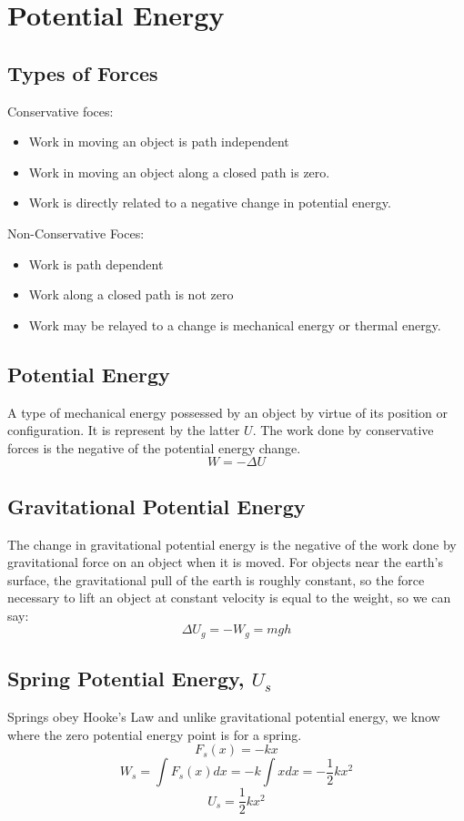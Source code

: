 \section{Potential Energy}

\subsection{Types of Forces}
\noindent Conservative foces:
\begin{itemize}
	\item Work in moving an object is path independent
	\item Work in moving an object along a closed path is zero.
	\item Work is directly related to a negative change in potential energy.
\end{itemize}

\noindent Non-Conservative Foces:
\begin{itemize}
	\item Work is path dependent
	\item Work along a closed path is not zero
	\item Work may be relayed to a change is mechanical energy or thermal energy.
\end{itemize}

\subsection{Potential Energy}
A type of mechanical energy possessed by an object by virtue of its position or configuration. It is represent  by the latter $U$. The work done by conservative forces is the negative of the potential energy change.
\[W=-\Delta U\]

\subsection{Gravitational Potential Energy}
The change in gravitational potential energy is the negative of the work done by gravitational force on an object when it is moved. For objects near the earth's surface, the gravitational pull of the earth is roughly constant, so the force necessary to lift an object at constant velocity is equal to the weight, so we can say:
\[\Delta U_g=-W_g=mgh\]

\subsection{Spring Potential Energy, $U_s$}
Springs obey Hooke's Law and unlike gravitational potential energy, we know where the zero potential energy point is for a spring.
\[F_s(x)=-kx\]
\[W_s=\int F_s(x)dx=-k\int xdx =-\frac{1}{2}kx^2\]
\[U_s=\frac{1}{2}kx^2\]